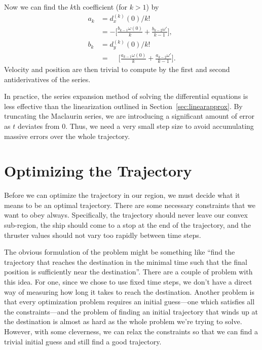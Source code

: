 \documentclass{report}
\begin{document}
Now we can find the $k$th coefficient (for $k > 1$) by
\begin{equation}
    \begin{aligned}
        a_k &= d_x^{(k)}(0)/k! \\
            &= -\Bigg[ \frac{b_{k-1} \omega(0)}{k}  + \frac{b_{k-2} \omega'}{k-1}  \Bigg],\\
        b_k &= d_y^{(k)}(0)/k! \\
            &= \phantom{-} \Bigg[ \frac{a_{k-1} \omega(0)}{k}  + \frac{a_{k-2} \omega'}{k-1}  \Bigg].
    \end{aligned}
\end{equation}
Velocity and position are then trivial to compute by the first and second antiderivatives
of the series.

In practice, the series expansion method of solving the differential equations is less effective
than the linearization outlined in Section~\ref{sec:linearapprox}. By truncating the Maclaurin series, we
are introducing a significant amount of error as $t$ deviates from $0$. Thus, we need a very small step size
to avoid accumulating massive errors over the whole trajectory.

\section{Optimizing the Trajectory}
Before we can optimize the trajectory in our region, we must decide what it means to
be an optimal trajectory. There are some necessary constraints that we want to obey always. Specifically,
the trajectory should never leave our convex sub-region, the ship should come to a stop at the end of
the trajectory, and the thruster values should not vary too rapidly between time steps.

The obvious formulation of the problem might be something like ``find the trajectory that reaches the destination
in the minimal time such that the final position is sufficiently near the destination''. There are a couple of problem
with this idea. For one, since we chose to use fixed time steps, we don't have a direct way of measuring how
long it takes to reach the destination. Another problem is that every optimization problem requires an initial guess---one
which satisfies all the constraints---and the problem of finding an initial trajectory that winds up at the destination
is almost as hard as the whole problem we're trying to solve. However, with some cleverness, we can relax the constraints
so that we can find a trivial initial guess and still find a good trajectory.
\end{document}
